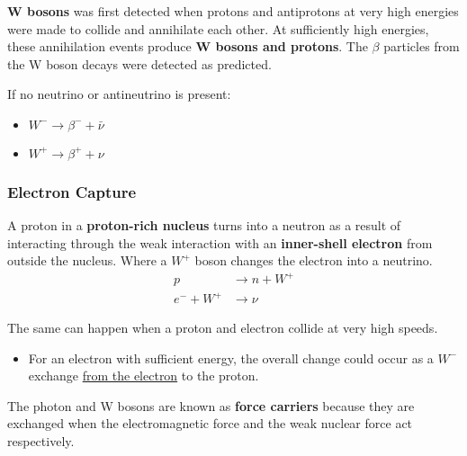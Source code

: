 \textbf{W bosons} was first detected when protons and antiprotons at very high energies were made to collide and annihilate each other. At sufficiently high energies, these annihilation events produce \textbf{W bosons and protons}. The $\beta$ particles from the W boson decays were detected as predicted.

If no neutrino or antineutrino is present:
\begin{itemize}
    \item $W^-\to\beta^-+\bar\nu$
    \item $W^+\to\beta^++\nu$
\end{itemize}

\subsubsection*{Electron Capture}

A proton in a \textbf{proton-rich nucleus} turns into a neutron as a result of interacting through the weak interaction with an \textbf{inner-shell electron} from outside the nucleus. Where a $W^+$ boson changes the electron into a neutrino.
\begin{align*}
    p&\to n+W^+\\
    e^-+W^+&\to\nu
\end{align*}

The same can happen when a proton and electron collide at very high speeds.
\begin{itemize}
    \item For an electron with sufficient energy, the overall change could occur as a $W^-$ exchange \underline{from the electron} to the proton.
\end{itemize}

The photon and W bosons are known as \textbf{force carriers} because they are exchanged when the electromagnetic force and the weak nuclear force act respectively.
